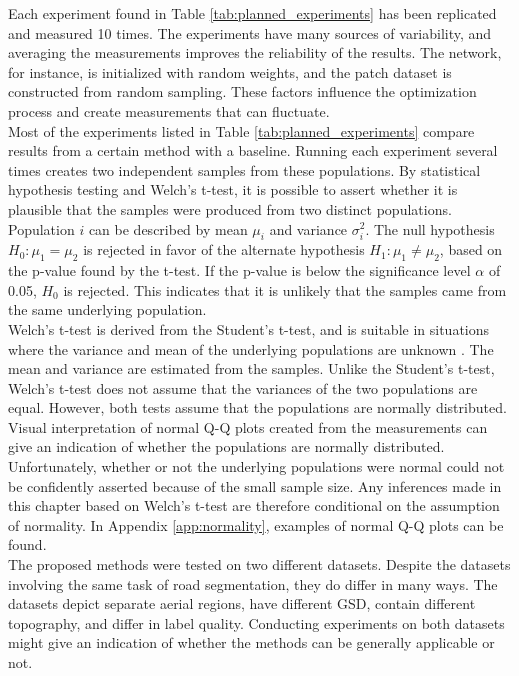 Each experiment found in Table \ref{tab:planned_experiments} has been replicated and measured 10 times. The experiments have many sources of variability, and averaging the measurements improves the reliability of the results. The network, for instance, is initialized with random weights, and the patch dataset is constructed from random sampling. These factors influence the optimization process and create measurements that can fluctuate.\\

Most of the experiments listed in Table \ref{tab:planned_experiments} compare results from a certain method with a baseline. Running each experiment several times creates two independent samples from these populations. By statistical hypothesis testing and Welch's t-test, it is possible to assert whether it is plausible that the samples were produced from two distinct populations. Population $i$ can be described by mean $\mu_i$ and variance $\sigma^2_i$. The null hypothesis $H_0\colon \mu_1 = \mu_2$ is rejected in favor of the alternate hypothesis $H_1\colon\mu_1 \neq \mu_2$, based on the p-value found by the t-test.  If the p-value is below the significance level $\alpha$ of 0.05, $H_0$ is rejected. This indicates that it is unlikely that the samples came from the same underlying population.\\

Welch's t-test is derived from the Student's t-test, and is suitable in situations where the variance and mean of the underlying populations are unknown \citep[Chapter~10]{walpole_probability}. The mean and variance are estimated from the samples. Unlike the Student's t-test, Welch's t-test does not assume that the variances of the two populations are equal. However, both tests assume that the populations are normally distributed. Visual interpretation of normal Q-Q plots created from the measurements can give an indication of whether the populations are normally distributed. Unfortunately, whether or not the underlying populations were normal could not be confidently asserted because of the small sample size. Any inferences made in this chapter based on Welch's t-test are therefore conditional on the assumption of normality. In Appendix \ref{app:normality}, examples of normal Q-Q plots can be found.\\ 
 
The proposed methods were tested on two different datasets. Despite the datasets involving the same task of road segmentation, they do differ in many ways. The datasets depict separate aerial regions, have different \ac{GSD}, contain different topography, and differ in label quality. Conducting experiments on both datasets might give an indication of whether the methods can be generally applicable or not.\\

